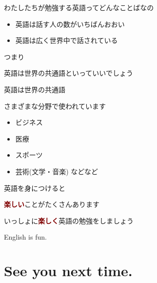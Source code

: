 \documentclass[
  ignorenonframetext,
  aspectratio=169,
  xcolor=dvipsnames]{beamer}
\providecommand{\tightlist}{%
  \setlength{\itemsep}{0pt}\setlength{\parskip}{0pt}}
\begin{document}
\begin{frame}{わたしたちが勉強する英語ってどんなことばなの}
\protect{}\label{ux308fux305fux3057ux305fux3061ux304cux52c9ux5f37ux3059ux308bux82f1ux8a9eux3063ux3066ux3069ux3093ux306aux3053ux3068ux3070ux306aux306e}
\Large

\begin{itemize}[<+->]
\tightlist
\item
  英語は話す人の数が\textcolor{NavyBlue}{いちばんおおい}
\item
  英語は\textcolor{NavyBlue}{広く世界中で}話されている
\end{itemize}

\pause

つまり\pause

\textcolor{NavyBlue}{英語は世界の共通語}といっていいでしょう
\end{frame}

\begin{frame}{英語は世界の共通語}
\protect{}\label{ux82f1ux8a9eux306fux4e16ux754cux306eux5171ux901aux8a9e}
\Large

さまざまな分野で使われています

\begin{itemize}[<+->]
\tightlist
\item
  ビジネス
\item
  医療
\item
  スポーツ
\item
  芸術(文学・音楽) などなど
\end{itemize}
\end{frame}

\begin{frame}{英語を身につけると}
\protect{}\label{ux82f1ux8a9eux3092ux8eabux306bux3064ux3051ux308bux3068}
\Large

\textcolor{Maroon}{\bfseries 楽しい}ことがたくさんあります\pause

いっしょに\textcolor{Maroon}{\bfseries 楽しく}英語の勉強をしましょう
\end{frame}

\begin{frame}{}
\protect{}\label{section-9}
\Huge

\centering

English is fun.
\end{frame}

\section{See you next time.}\label{see-you-next-time.}
\end{document}
